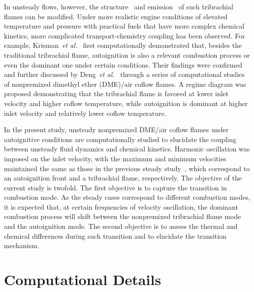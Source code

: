 \documentclass{essci}
\begin{document}
In unsteady flows, however, the structure~\cite{strawa89,sanchezsanz10} and emission~\cite{shaddix94,skaggs96,mohammed98,dworkin07} of such tribrachial flames can be modified.  Under more realistic engine conditions of elevated temperature and pressure with practical fuels that have more complex chemical kinetics, more complicated transport-chemistry coupling has been observed.  For example, Krisman~\emph{et al.}~\cite{krisman14} first computationally demonstrated that, besides the traditional tribrachial flame, autoignition is also a relevant combustion process or even the dominant one under certain conditions.  Their findings were confirmed and further discussed by Deng~\emph{et al.}~\cite{deng15,deng15b} through a series of computational studies of nonpremixed dimethyl ether (DME)/air coflow flames.  A regime diagram was proposed demonstrating that the tribrachial flame is favored at lower inlet velocity and higher coflow temperature, while autoignition is dominant at higher inlet velocity and relatively lower coflow temperature.

In the present study, unsteady nonpremixed DME/air coflow flames under autoignitive conditions are computationally studied to elucidate the coupling between unsteady fluid dynamics and chemical kinetics.  Harmonic oscillation was imposed on the inlet velocity, with the maximum and minimum velocities maintained the same as those in the previous steady study~\cite{deng15b}, which correspond to an autoignition front and a tribrachial flame, respectively.  The objective of the current study is twofold.  The first objective is to capture the transition in combustion mode.  As the steady cases correspond to different combustion modes, it is expected that, at certain frequencies of velocity oscillation, the dominant combustion process will shift between the nonpremixed tribrachial flame mode and the autoignition mode.  The second objective is to assess the thermal and chemical differences during such transition and to elucidate the transition mechanism.


\section{Computational Details}
\end{document}
